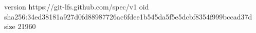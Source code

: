 version https://git-lfs.github.com/spec/v1
oid sha256:34ed38181a927d0fd88987726ac6fdee1b545da5f5e5dcbf8354f999bccad37d
size 21960
